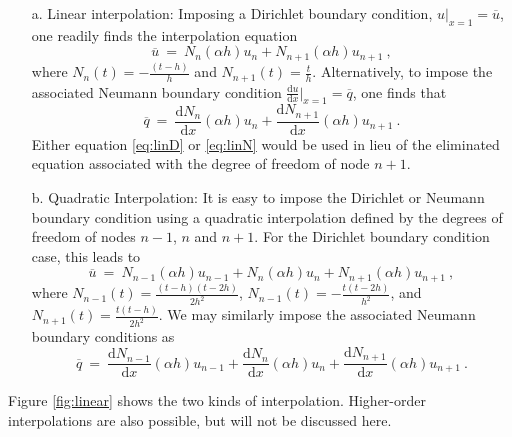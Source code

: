 \documentclass[12pt,twoside]{article}
\begin{document}
\begin{itemize}
%
\item[a.] Linear interpolation: Imposing a Dirichlet boundary condition, 
$u\vert_{x=1} = \overline{u}$, one readily finds the interpolation
equation 
%
\begin{equation}\label{eq:linD}
\overline{u}\ =\ N_n(\alpha h)u_{n}+N_{n+1}(\alpha h)u_{n+1}\ ,
\end{equation}
%
where $N_n(t) = -\frac{(t-h)}{h}$ and 
$N_{n+1}(t)= \frac{t}{h}$. Alternatively, to impose the associated Neumann boundary condition 
$\frac{\text{d}u}{\text{d}x}\vert_{x=1} = \overline{q}$, one finds that 
%
\begin{equation}\label{eq:linN}
\overline{q}\ =\ 
\frac{\text{d}N_n}{\text{d}x}(\alpha h)u_n+
\frac{\text{d}N_{n+1}}{\text{d}x}(\alpha h)u_{n+1}\ .
\end{equation}
Either equation \eqref{eq:linD} or \eqref{eq:linN} would be used in lieu of the 
eliminated equation associated with the degree of freedom of node $n+1$. 
%
\item[b.] Quadratic Interpolation: It is easy to impose the Dirichlet or
Neumann boundary condition using a quadratic interpolation defined by the 
degrees of freedom of nodes $n-1$, $n$ and $n+1$. For the Dirichlet boundary 
condition case, this leads to 
%
\begin{equation}\label{eq:quadD}
\overline{u}\ =\ N_{n-1}(\alpha h) u_{n-1}+
N_n(\alpha h) u_n + N_{n+1}(\alpha h) u_{n+1}\ , 
\end{equation}
%
where $N_{n-1}(t)= \frac{(t-h)(t-2h)}{2h^2}$, 
$N_{n-1}(t)= -\frac{t(t-2h)}{h^2}$, and 
$N_{n+1}(t)= \frac{t(t-h)}{2h^2}$. We may similarly impose the associated Neumann boundary conditions as 
%
\begin{equation}\label{eq:quadN}
\overline{q}\ =\ 
\frac{\text{d}N_{n-1}}{\text{d}x}(\alpha h)u_{n-1}+
\frac{\text{d}N_{n}}{\text{d}x}(\alpha h)u_{n}+
\frac{\text{d}N_{n+1}}{\text{d}x}(\alpha h)u_{n+1}\ .
\end{equation}
%
\end{itemize}
Figure \ref{fig:linear} shows the two kinds of interpolation. Higher-order interpolations are also possible, but will not be discussed here. 
\end{document}
